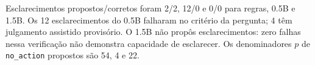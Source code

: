 Esclarecimentos propostos/corretos foram 2/2, 12/0 e 0/0 para regras, 0.5B e 1.5B. Os 12 esclarecimentos do 0.5B falharam no critério da pergunta; 4 têm julgamento assistido provisório. O 1.5B não propôs esclarecimentos: zero falhas nessa verificação não demonstra capacidade de esclarecer. Os denominadores $p$ de \texttt{no\_action} propostos são 54, 4 e 22.
